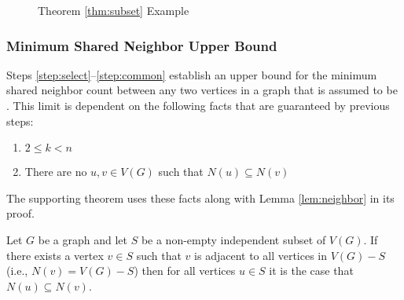 \begin{figure}[h]
  \label{fig:subset}
  \begin{center}
  \end{center}
  \caption{Theorem \ref{thm:subset} Example}
\end{figure}

\subsubsection{Minimum Shared Neighbor Upper Bound}

Steps \ref{step:select}--\ref{step:common} establish an upper bound for the minimum shared neighbor count between
any two vertices in a graph that is assumed to be .  This limit is dependent on the following facts
that are guaranteed by previous steps:
\begin{enumerate}
\item \(2\le k<n\)
\item There are no \(u,v\in V(G)\) such that \(N(u)\subseteq N(v)\)
\end{enumerate}
The supporting theorem uses these facts along with Lemma \ref{lem:neighbor} in its proof.

\begin{lemma}
  \label{lem:neighbor}
  Let \(G\) be a graph and let \(S\) be a non-empty independent subset of \(V(G)\).  If there exists a vertex
  \(v\in S\) such that \(v\) is adjacent to all vertices in \(V(G)-S\) (i.e., \(N(v)=V(G)-S\)) then for all
  vertices \(u\in S\) it is the case that \(N(u)\subseteq N(v)\).
\end{lemma}

